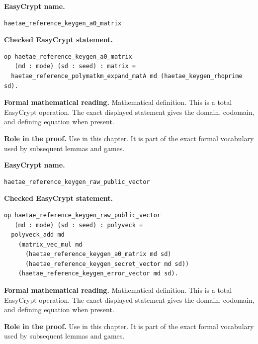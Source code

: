 \begin{formaldefinition}
\noindent\textbf{EasyCrypt name.}
\begin{lstlisting}[language=EasyCrypt,basicstyle=\ttfamily\scriptsize]
haetae_reference_keygen_a0_matrix
\end{lstlisting}
\noindent\textbf{Checked EasyCrypt statement.}
\begin{lstlisting}[language=EasyCrypt,basicstyle=\ttfamily\scriptsize]
op haetae_reference_keygen_a0_matrix
   (md : mode) (sd : seed) : matrix =
  haetae_reference_polymatkm_expand_matA md (haetae_keygen_rhoprime sd).
\end{lstlisting}
\noindent\textbf{Formal mathematical reading.}
Mathematical definition. This is a total EasyCrypt operation.  The exact displayed statement gives the domain, codomain, and defining equation when present.

\noindent\textbf{Role in the proof.}
Use in this chapter. It is part of the exact formal vocabulary used by subsequent lemmas and games.

\end{formaldefinition}

\begin{formaldefinition}
\noindent\textbf{EasyCrypt name.}
\begin{lstlisting}[language=EasyCrypt,basicstyle=\ttfamily\scriptsize]
haetae_reference_keygen_raw_public_vector
\end{lstlisting}
\noindent\textbf{Checked EasyCrypt statement.}
\begin{lstlisting}[language=EasyCrypt,basicstyle=\ttfamily\scriptsize]
op haetae_reference_keygen_raw_public_vector
   (md : mode) (sd : seed) : polyveck =
  polyveck_add md
    (matrix_vec_mul md
      (haetae_reference_keygen_a0_matrix md sd)
      (haetae_reference_keygen_secret_vector md sd))
    (haetae_reference_keygen_error_vector md sd).
\end{lstlisting}
\noindent\textbf{Formal mathematical reading.}
Mathematical definition. This is a total EasyCrypt operation.  The exact displayed statement gives the domain, codomain, and defining equation when present.

\noindent\textbf{Role in the proof.}
Use in this chapter. It is part of the exact formal vocabulary used by subsequent lemmas and games.

\end{formaldefinition}

